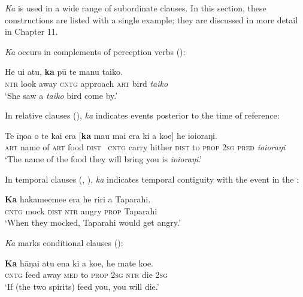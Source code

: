 \textit{Ka} is used in a wide range of subordinate clauses. In this section, these constructions are listed with a single example; they are discussed in more detail in Chapter 11. 

\textit{Ka} occurs in complements of perception verbs ():

\ea\label{ex:7.42}
\gll He u{\ꞌ}i atu, \textbf{ka} pū te manu taiko. \\
\textsc{ntr} look away \textsc{cntg} approach \textsc{art} bird \textit{taiko} \\

\glt
‘She saw a \textit{taiko} bird come by.’ \textstyleExampleref{[Ley-9-55.078]}
\z

In relative clauses (), \textit{ka} indicates events posterior to the time of reference:

\ea\label{ex:7.43}
\gll Te {\ꞌ}īŋoa o te kai era [\textbf{ka} ma{\ꞌ}u mai era ki a koe] he ioioraŋi. \\
\textsc{art} name of \textsc{art} food \textsc{dist} ~\textsc{cntg} carry hither \textsc{dist} to \textsc{prop} \textsc{2sg} \textsc{pred} \textit{ioioraŋi} \\

\glt
‘The name of the food they will bring you is \textit{ioioraŋi}.’ \textstyleExampleref{[R310.060]} 
\z

In temporal clauses (, ), \textit{ka} indicates temporal contiguity with the event in the :

\ea\label{ex:7.44}
\gll \textbf{Ka} hakame{\ꞌ}eme{\ꞌ}e era he riri a Taparahi. \\
\textsc{cntg} mock \textsc{dist} \textsc{ntr} angry \textsc{prop} Taparahi \\

\glt
‘When they mocked, Taparahi would get angry.’ \textstyleExampleref{[R250.151]} 
\z

\textit{Ka} marks conditional clauses ():

\ea\label{ex:7.45}
\gll \textbf{Ka} hāŋai atu ena ki a koe, he mate koe. \\
\textsc{cntg} feed away \textsc{med} to \textsc{prop} \textsc{2sg} \textsc{ntr} die \textsc{2sg} \\

\glt
‘If (the two spirits) feed you, you will die.’ \textstyleExampleref{[R310.061]} 
\z

